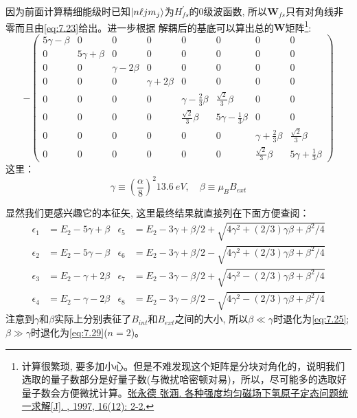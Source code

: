 \documentclass[a4paper,zihao=-4,linespread=1]{ctexrep}
\begin{document}
    因为前面计算精细能级时已知$\ket{n\ell j m_j}$为$H_{fs}^\prime$的0级波函数, 所以$\mathbf{W}_{fs}$只有对角线非零而且由\ref{eq:7.23}给出。进一步根据
    解耦后的基底可以算出总的$\mathbf{W}$矩阵\footnote{计算很繁琐, 要多加小心。但是不难发现这个矩阵是分块对角化的，说明我们选取的量子数部分是好量子数(与微扰哈密顿对易)，所以，尽可能多的选取好量子数会方便微扰计算。\href{http://dxwl.bnu.edu.cn/CN/abstract/abstract4031.shtml}{张永德 张涵. 各种强度均匀磁场下氢原子定态问题统一求解[J]. , 1997, 16(12): 2-2.}}:
    \begin{equation*}
        -\left(\begin{array}{cccccccc}
        5 \gamma-\beta & 0 & 0 & 0 & 0 & 0 & 0 & 0 \\
        0 & 5 \gamma+\beta & 0 & 0 & 0 & 0 & 0 & 0 \\
        0 & 0 & \gamma-2 \beta & 0 & 0 & 0 & 0 & 0 \\
        0 & 0 & 0 & \gamma+2 \beta & 0 & 0 & 0 & 0 \\
        0 & 0 & 0 & 0 & \gamma-\frac{2}{3} \beta & \frac{\sqrt{2}}{3} \beta & 0 & 0 \\
        0 & 0 & 0 & 0 & \frac{\sqrt{2}}{3} \beta & 5 \gamma-\frac{1}{3} \beta & 0 & 0 \\
        0 & 0 & 0 & 0 & 0 & 0 & \gamma+\frac{2}{3} \beta & \frac{\sqrt{2}}{3} \beta \\
        0 & 0 & 0 & 0 & 0 & 0 & \frac{\sqrt{2}}{3} \beta & 5 \gamma+\frac{1}{3} \beta
        \end{array}\right)
    \end{equation*}
    这里：\[\gamma\equiv\left(\frac{\alpha}{8}\right)^2\SI{13.6}{eV},\quad \beta\equiv\mu_BB_{ext}\]

    显然我们更感兴趣它的本征矢, 这里最终结果就直接列在下面方便查阅：
    \begin{align*}
        \epsilon_{1} &=E_{2}-5 \gamma+\beta& \epsilon_{5} &=E_{2}-3 \gamma+\beta / 2+\sqrt{4 \gamma^{2}+(2 / 3) \gamma \beta+\beta^{2} / 4} \\
        \epsilon_{2} &=E_{2}-5 \gamma-\beta& \epsilon_{6} &=E_{2}-3 \gamma+\beta / 2-\sqrt{4 \gamma^{2}+(2 / 3) \gamma \beta+\beta^{2} / 4} \\
        \epsilon_{3} &=E_{2}-\gamma+2 \beta& \epsilon_{7} &=E_{2}-3 \gamma-\beta / 2+\sqrt{4 \gamma^{2}-(2 / 3) \gamma \beta+\beta^{2} / 4}\\
        \epsilon_{4} &=E_{2}-\gamma-2 \beta& \epsilon_{8} &=E_{2}-3 \gamma-\beta / 2-\sqrt{4 \gamma^{2}-(2 / 3) \gamma \beta+\beta^{2} / 4}
    \end{align*}
    注意到$\gamma$和$\beta$实际上分别表征了$B_{int}$和$B_{ext}$之间的大小, 所以$\beta\ll\gamma$时退化为\ref{eq:7.25};$\beta\gg\gamma$时退化为\ref{eq:7.29}($n=2$)。
\end{document}
